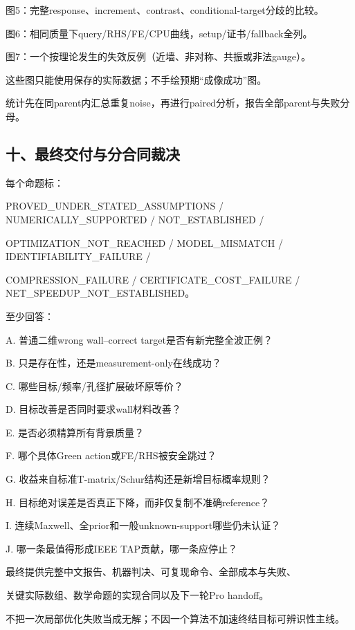 \documentclass[
  10pt,
  a4paper,
]{article}
\begin{document}
图5：完整response、increment、contrast、conditional-target分歧的比较。

图6：相同质量下query/RHS/FE/CPU曲线，setup/证书/fallback全列。

图7：一个按理论发生的失效反例（近墙、非对称、共振或非法gauge）。

这些图只能使用保存的实际数据；不手绘预期``成像成功''图。

统计先在同parent内汇总重复noise，再进行paired分析，报告全部parent与失败分母。

\hypertarget{ux5341ux6700ux7ec8ux4ea4ux4ed8ux4e0eux5206ux5408ux540cux88c1ux51b3}{%
\subsection{十、最终交付与分合同裁决}\label{ux5341ux6700ux7ec8ux4ea4ux4ed8ux4e0eux5206ux5408ux540cux88c1ux51b3}}

每个命题标：

PROVED\_UNDER\_STATED\_ASSUMPTIONS / NUMERICALLY\_SUPPORTED /
NOT\_ESTABLISHED /

OPTIMIZATION\_NOT\_REACHED / MODEL\_MISMATCH / IDENTIFIABILITY\_FAILURE
/

COMPRESSION\_FAILURE / CERTIFICATE\_COST\_FAILURE /
NET\_SPEEDUP\_NOT\_ESTABLISHED。

至少回答：

A. 普通二维wrong wall--correct target是否有新完整全波正例？

B. 只是存在性，还是measurement-only在线成功？

C. 哪些目标/频率/孔径扩展破坏原等价？

D. 目标改善是否同时要求wall材料改善？

E. 是否必须精算所有背景质量？

F. 哪个具体Green action或FE/RHS被安全跳过？

G. 收益来自标准T-matrix/Schur结构还是新增目标概率规则？

H. 目标绝对误差是否真正下降，而非仅复制不准确reference？

I. 连续Maxwell、全prior和一般unknown-support哪些仍未认证？

J. 哪一条最值得形成IEEE TAP贡献，哪一条应停止？

最终提供完整中文报告、机器判决、可复现命令、全部成本与失败、

关键实际数组、数学命题的实现合同以及下一轮Pro handoff。

不把一次局部优化失败当成无解；不因一个算法不加速终结目标可辨识性主线。
\end{document}
